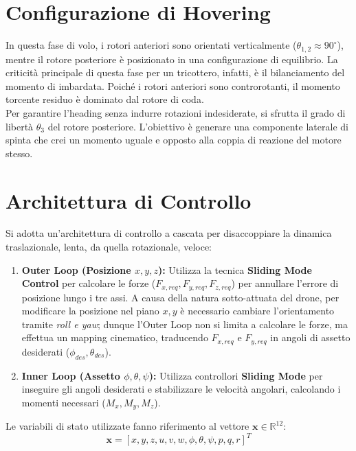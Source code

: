 \section{Configurazione di Hovering}
In questa fase di volo, i rotori anteriori sono orientati verticalmente ($\theta_{1,2} \approx 90^\circ$), mentre il rotore posteriore è posizionato in una configurazione di equilibrio. 
La criticità principale di questa fase per un tricottero, infatti, è il bilanciamento del momento di imbardata. 
Poiché i rotori anteriori sono controrotanti, il momento torcente residuo è dominato dal rotore di coda.
\\Per garantire l'heading senza indurre rotazioni indesiderate, si sfrutta il grado di libertà $\theta_3$ del rotore posteriore. L'obiettivo è generare una componente laterale di spinta che crei un momento uguale e opposto alla coppia di reazione del motore stesso.

\section{Architettura di Controllo}
Si adotta un'architettura di controllo a cascata per disaccoppiare la dinamica traslazionale, lenta, da quella rotazionale, veloce:
\begin{enumerate}
    \item \textbf{Outer Loop (Posizione $x, y, z$):} Utilizza la tecnica \textbf{Sliding Mode Control} per calcolare le forze ($F_{x,req}, F_{y,req}, F_{z,req}$) per annullare l'errore di posizione lungo i tre assi.
    A causa della natura sotto-attuata del drone, per modificare la posizione nel piano $x,y$ è necessario cambiare l'orientamento tramite \textit{roll e yaw}; dunque l'Outer Loop non si limita a calcolare le forze, ma effettua un mapping cinematico, traducendo $F_{x,req}$ e $F_{y,req}$ in angoli di assetto desiderati ($\phi_{des}, \theta_{des}$).
    \item \textbf{Inner Loop (Assetto $\phi, \theta, \psi$):} Utilizza controllori \textbf{Sliding Mode} per inseguire gli angoli desiderati e stabilizzare le velocità angolari, calcolando i momenti necessari ($M_x, M_y, M_z$).
\end{enumerate}
Le variabili di stato utilizzate fanno riferimento al vettore $ \bm{x} \in \mathbb{R}^{12} $:
\[
\bm{x} = [x, y, z, u, v, w, \phi, \theta, \psi, p, q, r]^T
\]

    
